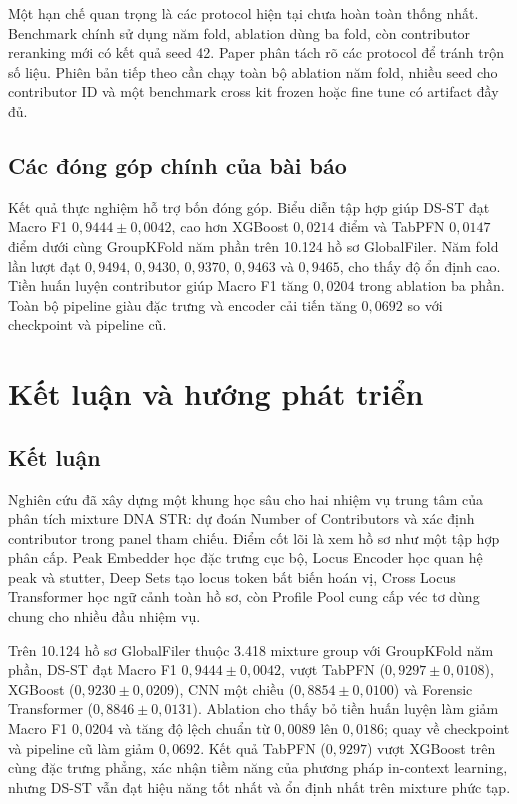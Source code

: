 \documentclass[12pt,a4paper]{article}
\begin{document}
Một hạn chế quan trọng là các protocol hiện tại chưa hoàn toàn thống nhất. Benchmark chính sử dụng năm fold, ablation dùng ba fold, còn contributor reranking mới có kết quả seed 42. Paper phân tách rõ các protocol để tránh trộn số liệu. Phiên bản tiếp theo cần chạy toàn bộ ablation năm fold, nhiều seed cho contributor ID và một benchmark cross kit frozen hoặc fine tune có artifact đầy đủ.

\subsection{Các đóng góp chính của bài báo}

Kết quả thực nghiệm hỗ trợ bốn đóng góp. Biểu diễn tập hợp giúp DS-ST đạt Macro F1 $0{,}9444\pm0{,}0042$, cao hơn XGBoost $0{,}0214$ điểm và TabPFN $0{,}0147$ điểm dưới cùng GroupKFold năm phần trên 10.124 hồ sơ GlobalFiler. Năm fold lần lượt đạt $0{,}9494$, $0{,}9430$, $0{,}9370$, $0{,}9463$ và $0{,}9465$, cho thấy độ ổn định cao. Tiền huấn luyện contributor giúp Macro F1 tăng $0{,}0204$ trong ablation ba phần. Toàn bộ pipeline giàu đặc trưng và encoder cải tiến tăng $0{,}0692$ so với checkpoint và pipeline cũ.

\section{Kết luận và hướng phát triển}

\subsection{Kết luận}

Nghiên cứu đã xây dựng một khung học sâu cho hai nhiệm vụ trung tâm của phân tích mixture DNA STR: dự đoán Number of Contributors và xác định contributor trong panel tham chiếu. Điểm cốt lõi là xem hồ sơ như một tập hợp phân cấp. Peak Embedder học đặc trưng cục bộ, Locus Encoder học quan hệ peak và stutter, Deep Sets tạo locus token bất biến hoán vị, Cross Locus Transformer học ngữ cảnh toàn hồ sơ, còn Profile Pool cung cấp véc tơ dùng chung cho nhiều đầu nhiệm vụ.

Trên 10.124 hồ sơ GlobalFiler thuộc 3.418 mixture group với GroupKFold năm phần, DS-ST đạt Macro F1 $0{,}9444\pm0{,}0042$, vượt TabPFN ($0{,}9297\pm0{,}0108$), XGBoost ($0{,}9230\pm0{,}0209$), CNN một chiều ($0{,}8854\pm0{,}0100$) và Forensic Transformer ($0{,}8846\pm0{,}0131$). Ablation cho thấy bỏ tiền huấn luyện làm giảm Macro F1 $0{,}0204$ và tăng độ lệch chuẩn từ $0{,}0089$ lên $0{,}0186$; quay về checkpoint và pipeline cũ làm giảm $0{,}0692$. Kết quả TabPFN ($0{,}9297$) vượt XGBoost trên cùng đặc trưng phẳng, xác nhận tiềm năng của phương pháp in-context learning, nhưng DS-ST vẫn đạt hiệu năng tốt nhất và ổn định nhất trên mixture phức tạp.
\end{document}
